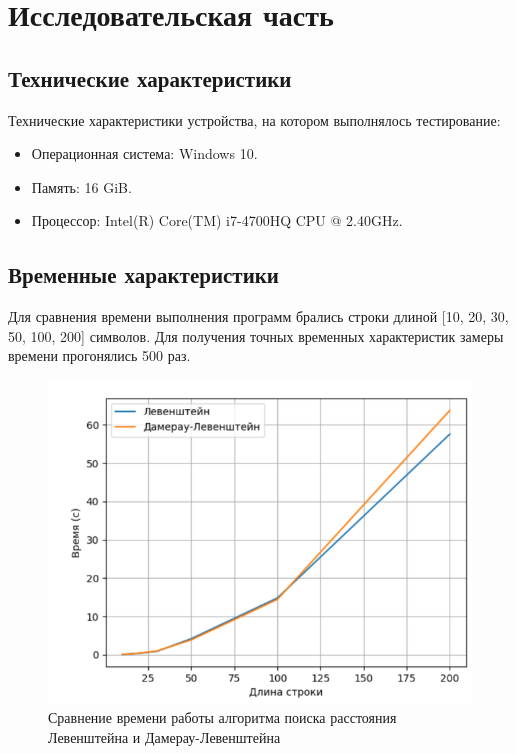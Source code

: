 \chapter{Исследовательская часть}




\section{Технические характеристики}

Технические характеристики устройства, на котором выполнялось тестирование:

\begin{itemize}
	\item Операционная система: Windows 10. \cite{windows}
	\item Память: 16 GiB.
	\item Процессор: Intel(R) Core(TM) i7-4700HQ CPU @ 2.40GHz. \cite{intel}
\end{itemize}


\section{Временные характеристики}

Для сравнения времени выполнения программ брались строки длиной [10, 20, 30, 50, 100, 200] символов. Для получения точных временных характеристик замеры времени прогонялись 500 раз. 

\begin{figure}[h]
    \centering
    \includegraphics[width=130mm]{inc/img/timing.png}
    \caption{Сравнение времени работы алгоритма поиска расстояния Левенштейна и Дамерау-Левенштейна}
    \label{img:timing}
\end{figure}







